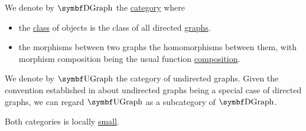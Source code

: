 \begin{definition}\label{def:category_of_graphs}
  We denote by \( \Cat{DGraph} \) the \hyperref[def:category]{category} where
  \begin{itemize}
    \item the \hyperref[def:set_zfc]{class} of objects is the class of all directed \hyperref[def:directed_graph]{graphs}.
    \item the morphisms between two graphs the homomorphisms between them, with morphism composition being the usual function \hyperref[def:function/composition]{composition}.
  \end{itemize}

  We denote by \( \Cat{UGraph} \) the category of undirected graphs. Given the convention established in  about undirected graphs being a special case of directed graphs, we can regard \( \Bold{UGraph} \) as a subcategory of \( \Bold{DGraph} \).

  Both categories is locally \hyperref[def:category_cardinality]{small}.
\end{definition}
